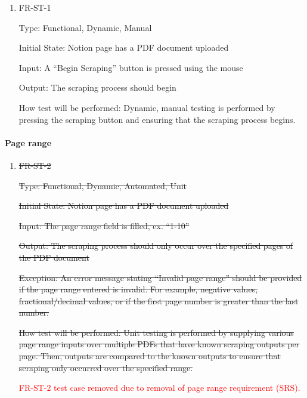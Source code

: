 \documentclass[12pt, titlepage]{article}
\begin{document}
\begin{enumerate}

\item{FR-ST-1\\}

Type: Functional, Dynamic, Manual 

Initial State: Notion page has a PDF document uploaded 

Input: A “Begin Scraping” button is pressed using the mouse 

Output: The scraping process should begin 

How test will be performed: Dynamic, manual testing is performed by pressing the scraping button and ensuring that the scraping process begins. 

\end{enumerate}

\paragraph{Page range}

\begin{enumerate}

\item{\sout{FR-ST-2}\\}

\sout{Type: Functional, Dynamic, Automated, Unit} 

\sout{Initial State: Notion page has a PDF document uploaded} 

\sout{Input: The page range field is filled, ex. “1-10” }

\sout{Output: The scraping process should only occur over the specified pages of the PDF document }

\sout{Exception: An error message stating “Invalid page range” should be provided if the page range entered is invalid. For example, negative values, fractional/decimal values, or if the first page number is greater than the last number.} 

\sout{How test will be performed: Unit testing is performed by supplying various page range inputs over multiple PDFs that have known scraping outputs per page. Then, outputs are compared to the known outputs to ensure that scraping only occurred over the specified range.}

\textcolor{red}{FR-ST-2 test case removed due to removal of page range requirement (SRS).}

\end{enumerate}
\end{document}
